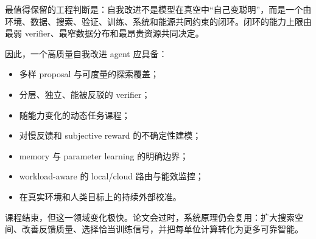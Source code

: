 \documentclass[a4paper]{article}
\begin{document}
最值得保留的工程判断是：自我改进不是模型在真空中“自己变聪明”，而是一个由环境、数据、搜索、验证、训练、系统和能源共同约束的闭环。闭环的能力上限由最弱 verifier、最窄数据分布和最昂贵资源共同决定。

因此，一个高质量自我改进 agent 应具备：

\begin{itemize}
    \item 多样 proposal 与可度量的探索覆盖；
    \item 分层、独立、能被反驳的 verifier；
    \item 随能力变化的动态任务课程；
    \item 对慢反馈和 subjective reward 的不确定性建模；
    \item memory 与 parameter learning 的明确边界；
    \item workload-aware 的 local/cloud 路由与能效监控；
    \item 在真实环境和人类目标上的持续外部校准。
\end{itemize}

课程结束，但这一领域变化极快。论文会过时，系统原理仍会复用：扩大搜索空间、改善反馈质量、选择恰当训练信号，并把每单位计算转化为更多可靠智能。
\end{document}
